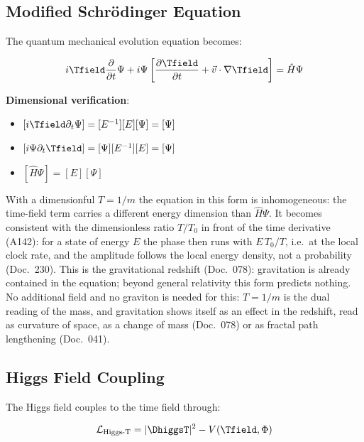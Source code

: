 	\subsection{Modified Schrödinger Equation}
	\label{subsec:modified_schrodinger}
	
	The quantum mechanical evolution equation becomes:
	
	\begin{equation}
		i \Tfield \frac{\partial}{\partial t} \Psi + i \Psi \left[\frac{\partial \Tfield}{\partial t} + \vec{v} \cdot \nabla \Tfield\right] = \hat{H} \Psi
		\label{eq:modified_schrodinger}
	\end{equation}
	
	\textbf{Dimensional verification}:
	\begin{itemize}
		\item $[i \Tfield \partial_t \Psi] = [E^{-1}][E][\Psi] = [\Psi]$
		\item $[i \Psi \partial_t \Tfield] = [\Psi][E^{-1}][E] = [\Psi]$
		\item $[\hat{H} \Psi] = [E][\Psi]$
	\end{itemize}
	With a dimensionful $T=1/m$ the equation in this form is inhomogeneous: the time-field term carries a different energy dimension than $\hat H\Psi$. It becomes consistent with the dimensionless ratio $T/T_0$ in front of the time derivative (A142): for a state of energy $E$ the phase then runs with $E\,T_0/T$, i.e.\ at the local clock rate, and the amplitude follows the local energy density, not a probability (Doc.~230). This is the gravitational redshift (Doc.~078): gravitation is already contained in the equation; beyond general relativity this form predicts nothing. No additional field and no graviton is needed for this: $T=1/m$ is the dual reading of the mass, and gravitation shows itself as an effect in the redshift, read as curvature of space, as a change of mass (Doc.~078) or as fractal path lengthening (Doc.~041).
	
	\subsection{Higgs Field Coupling}
	\label{subsec:higgs_coupling}
	
	The Higgs field couples to the time field through:
	
	\begin{equation}
		\mathcal{L}_{\text{Higgs-T}} = |\DhiggsT|^2 - V(\Tfield, \Phi)
		\label{eq:higgs_time_coupling}
	\end{equation}
	
